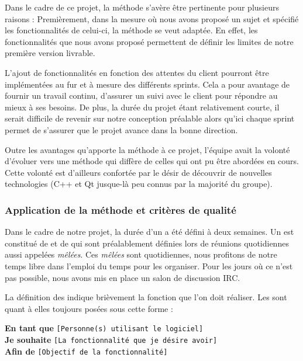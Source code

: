 Dans le cadre de ce projet, la méthode \scrum{} s’avère être pertinente pour plusieurs raisons : 
Premièrement, dans la mesure où nous avons proposé un sujet et spécifié les fonctionnalités de celui-ci, la méthode \scrum{} se veut adaptée. En effet,
les fonctionnalités que nous avons proposé permettent de définir les limites de notre première version \release{} livrable. 

L'ajout de fonctionnalités en fonction des attentes du client pourront être implémentées au fur et à mesure des différents sprints.  Cela a pour
avantage de fournir un travail continu, d’assurer un suivi avec le client pour répondre au mieux à ses besoins. De plus, la durée du projet étant
relativement courte, il serait difficile de revenir sur notre conception préalable alors qu'ici chaque sprint permet de s’assurer que le projet
avance dans la bonne direction.


Outre les avantages qu'apporte la méthode \scrum{} à ce projet, l'équipe avait la volonté d’évoluer vers une méthode qui diffère de celles qui ont pu
être abordées en cours. Cette volonté est d’ailleurs confortée par le désir de découvrir  de nouvelles technologies (C++ et Qt jusque-là peu connus
par la majorité du groupe). 


\subsubsection{Application de la méthode \scrum{} et critères de qualité}
Dans le cadre de notre projet, la durée d'un \sprint{} a été défini à deux semaines. Un \sprint{} est constitué de \user{} \stories{} et de 
\technicals{} \stories{} qui sont préalablement définies lors de réunions quotidiennes aussi appelées \textit{mêlées}. Ces \textit{mêlées} sont quotidiennes, nous
profitons de notre temps libre dans l’emploi du temps pour les organiser. Pour les jours où ce n’est pas possible, nous avons mis en place un salon
de discussion IRC.  

La définition des \technical{} \story{} indique brièvement la fonction que l'on doit réaliser. Les \user{} \story{} sont quant à elles toujours posées
sous cette forme :

\begin{exemple}
	\textbf{En tant que} \texttt{[Personne(s) utilisant le logiciel]}\\
	\textbf{Je souhaite} \texttt{[La fonctionnalité que je désire avoir]}\\
	\textbf{Afin de} \texttt{[Objectif de la fonctionnalité]}
\end{exemple}


